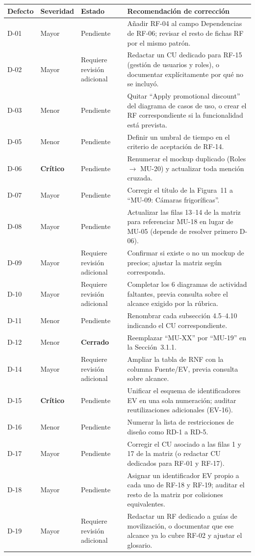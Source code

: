 \documentclass[11pt,a4paper]{article}
\begin{document}
\begin{longtable}{|p{1.1cm}|p{1.4cm}|p{2.5cm}|p{8.8cm}|}
\hline
\textbf{Defecto} & \textbf{Severidad} & \textbf{Estado} & \textbf{Recomendación de corrección} \\
\hline
D-01 & Mayor & Pendiente & Añadir RF-04 al campo Dependencias de RF-06; revisar el resto de fichas RF por el mismo patrón. \\
\hline
D-02 & Mayor & Requiere revisión adicional & Redactar un CU dedicado para RF-15 (gestión de usuarios y roles), o documentar explícitamente por qué no se incluyó. \\
\hline
D-03 & Menor & Pendiente & Quitar ``Apply promotional discount'' del diagrama de casos de uso, o crear el RF correspondiente si la funcionalidad está prevista. \\
\hline
D-05 & Menor & Pendiente & Definir un umbral de tiempo en el criterio de aceptación de RF-14. \\
\hline
D-06 & \textbf{Crítico} & Pendiente & Renumerar el mockup duplicado (Roles $\rightarrow$ MU-20) y actualizar toda mención cruzada. \\
\hline
D-07 & Mayor & Pendiente & Corregir el título de la Figura~11 a ``MU-09: Cámaras frigoríficas''. \\
\hline
D-08 & Mayor & Pendiente & Actualizar las filas 13--14 de la matriz para referenciar MU-18 en lugar de MU-05 (depende de resolver primero D-06). \\
\hline
D-09 & Mayor & Requiere revisión adicional & Confirmar si existe o no un mockup de precios; ajustar la matriz según corresponda. \\
\hline
D-10 & Mayor & Requiere revisión adicional & Completar los 6 diagramas de actividad faltantes, previa consulta sobre el alcance exigido por la rúbrica. \\
\hline
D-11 & Menor & Pendiente & Renombrar cada subsección 4.5--4.10 indicando el CU correspondiente. \\
\hline
D-12 & Menor & \textbf{Cerrado} & Reemplazar ``MU-XX'' por ``MU-19'' en la Sección~3.1.1. \\
\hline
D-14 & Mayor & Requiere revisión adicional & Ampliar la tabla de RNF con la columna Fuente/EV, previa consulta sobre alcance. \\
\hline
D-15 & \textbf{Crítico} & Pendiente & Unificar el esquema de identificadores EV en una sola numeración; auditar reutilizaciones adicionales (EV-16). \\
\hline
D-16 & Menor & Pendiente & Numerar la lista de restricciones de diseño como RD-1 a RD-5. \\
\hline
D-17 & Mayor & Pendiente & Corregir el CU asociado a las filas 1 y 17 de la matriz (o redactar CU dedicados para RF-01 y RF-17). \\
\hline
D-18 & Mayor & Pendiente & Asignar un identificador EV propio a cada uno de RF-18 y RF-19; auditar el resto de la matriz por colisiones equivalentes. \\
\hline
D-19 & Mayor & Requiere revisión adicional & Redactar un RF dedicado a guías de movilización, o documentar que ese alcance ya lo cubre RF-02 y ajustar el glosario. \\
\hline
\end{longtable}
\end{document}
